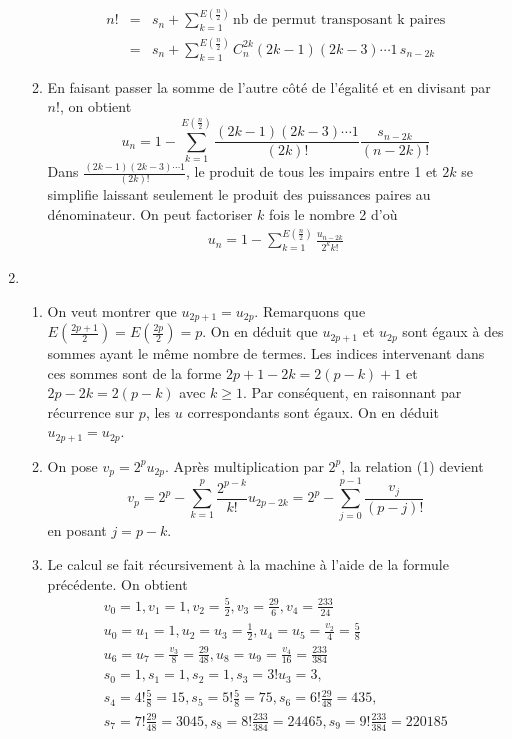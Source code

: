 \begin{enumerate}
\begin{enumerate}
    \begin{eqnarray*}
n!&=& s_n+\sum_{k=1}^{E(\frac{n}{2})}\mbox{nb de permut transposant k
  paires}\\
&=&s_n+\sum_{k=1}^{E(\frac{n}{2})}C_n^{2k}(2k-1)(2k-3)\cdots 1\,s_{n-2k}
    \end{eqnarray*}
  \item En faisant passer la somme de l'autre côté de l'égalité et en
    divisant par $n!$, on obtient
\[u_n=1-\sum_{k=1}^{E(\frac{n}{2})}\frac{(2k-1)(2k-3)\cdots 1}{(2k)!}
\frac{s_{n-2k}}{(n-2k)!}\]
Dans $\frac{(2k-1)(2k-3)\cdots 1}{(2k)!}$, le produit de tous les
impairs entre 1 et $2k$ se simplifie laissant seulement le produit des
puissances paires au dénominateur. On peut factoriser $k$ fois le
nombre 2 d'où
\begin{eqnarray}
  u_n=1-\sum_{k=1}^{E(\frac{n}{2})}\frac{u_{n-2k}}{2^kk!}
\end{eqnarray}
  \end{enumerate}
\item 
  \begin{enumerate}
  \item On veut montrer que $u_{2p+1}=u_{2p}$. Remarquons que
    $E(\frac{2p+1}{2})= E(\frac{2p}{2})=p$. On en déduit que $u_{2p+1}$
    et $u_{2p}$ sont égaux à des sommes ayant le même nombre de
    termes. Les indices intervenant dans ces sommes sont de la forme
    $2p+1-2k=2(p-k)+1$ et $2p-2k=2(p-k)$ avec $k\geq 1$. Par
    conséquent, en raisonnant par récurrence sur $p$, les $u$
    correspondants sont égaux. On en déduit  $u_{2p+1}=u_{2p}$.
  \item On pose $v_p=2^pu_{2p}$. Après multiplication par $2^p$, la
    relation (1) devient
\[v_p=2^p-\sum_{k=1}^{p}\frac{2^{p-k}}{k!}u_{2p-2k}=2^p-\sum_{j=0}^{p-1}
\frac{v_j}{(p-j)!}\]
en posant $j=p-k$.
  \item  Le calcul se fait récursivement à la machine à l'aide de la
    formule précédente. On obtient
    \begin{eqnarray*}
      v_0=1,v_1=1,v_2=\frac{5}{2},v_3=\frac{29}{6},v_4=\frac{233}{24}\\
u_0=u_1=1,u_2=u_3=\frac{1}{2},u_4=u_5=\frac{v_2}{4}=\frac{5}{8}\\
u_6=u_7=\frac{v_3}{8}=\frac{29}{48},u_8=u_9=\frac{v_4}{16}=\frac{233}{384}\\
s_0=1,s_1=1,s_2=1,s_3=3!u_3=3,\\
s_4=4!\frac{5}{8}=15,s_5=5!\frac{5}{8}=75,s_6=6!\frac{29}{48}=435,\\
s_7=7!\frac{29}{48}=3045,s_8=8!\frac{233}{384}=24465,s_9=9!\frac{233}{384}=220185
    \end{eqnarray*}
  \end{enumerate}
\end{enumerate}
